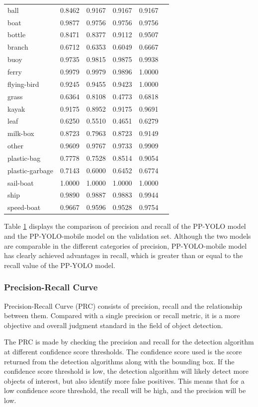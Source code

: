 \documentclass[sensors,article,submit,moreauthors,pdftex]{Definitions/mdpi}
\begin{document}
\begin{paracol}{2}
\begin{table}[htbp]
\begin{tabular}{lccccc}
\midrule
ball& 0.8462& 0.9167& 0.9167& 0.9167 \\
boat& 0.9877& 0.9756& 0.9756& 0.9756 \\
bottle& 0.8471& 0.8377& 0.9112& 0.9507 \\
branch& 0.6712& 0.6353& 0.6049& 0.6667 \\
buoy& 0.9735& 0.9815& 0.9875& 0.9938 \\
ferry& 0.9979& 0.9979& 0.9896& 1.0000 \\
flying-bird& 0.9245&0.9455 & 0.9423& 1.0000 \\
grass& 0.6364& 0.8108& 0.4773& 0.6818 \\
kayak& 0.9175& 0.8952& 0.9175& 0.9691 \\
leaf& 0.6250& 0.5510& 0.4651& 0.6279 \\
milk-box& 0.8723& 0.7963& 0.8723& 0.9149 \\
other& 0.9609& 0.9767& 0.9733& 0.9909 \\
plastic-bag& 0.7778& 0.7528& 0.8514& 0.9054 \\
plastic-garbage& 0.7143&0.6000 & 0.6452& 0.6774 \\
sail-boat& 1.0000& 1.0000& 1.0000& 1.0000 \\
ship& 0.9890& 0.9887& 0.9883& 0.9944 \\
speed-boat& 0.9667& 0.9596& 0.9528& 0.9754 \\

\bottomrule
\end{tabular}
\label{tbl:precision}
\end{table}

Table \ref{tbl:precision} displays the comparison of precision and recall of the PP-YOLO model and the PP-YOLO-mobile model on the validation set. Although the two models are comparable in the different categories of precision, PP-YOLO-mobile model has clearly achieved advantages in recall, which is greater than or equal to the recall value of the PP-YOLO model.


\subsubsection{Precision-Recall Curve}
Precision-Recall Curve (PRC) consists of precision, recall and the relationship between them. Compared with a single precision or recall metric, it is a more objective and overall judgment standard in the field of object detection. 

The PRC is made by checking the precision and recall for the detection algorithm at different confidence score thresholds. The confidence score used is the score returned from the detection algorithms along with the bounding box. If the confidence score threshold is low, the detection algorithm will likely detect more objects of interest, but also identify more false positives. This means that for a low confidence score threshold, the recall will be high, and the precision will be low.


\end{paracol}
\end{document}
